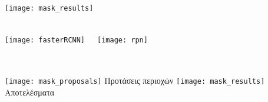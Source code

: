 







% 
\gr
\section{}

\subsection{}
\begin{frame}
  \frametitle{}
  \centering
  \texttt{[image: mask\_results]}
\end{frame}

\begin{frame}
  \frametitle{}
\begin{columns}
  \texttt{[image: fasterRCNN]}
  \centering
  \\

  \centering
  \texttt{[image: rpn]}
  \\

\end{columns}
\end{frame}


\begin{frame}
  \frametitle{}
\begin{columns}
  \texttt{[image: mask\_proposals]}
  Προτάσεις περιοχών 
  \centering
  \texttt{[image: mask\_results]}
  \centering
  Αποτελέσματα
\end{columns}
\end{frame}


